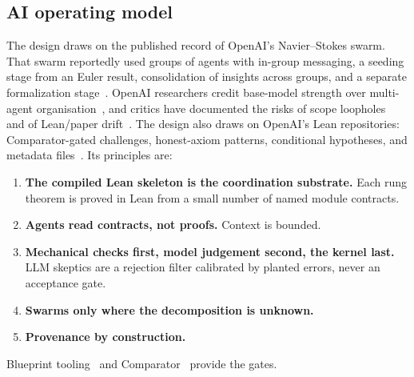 \documentclass[11pt]{article}
\theoremstyle{definition}
\theoremstyle{remark}
\begin{document}
\subsection{AI operating model}
The design draws on the published record of OpenAI's Navier--Stokes swarm. That swarm reportedly
used groups of agents with in-group messaging, a seeding stage from an Euler result, consolidation
of insights across groups, and a separate formalization
stage~\cite{OpenAI2026g,Howlett2026h,OpenAI2026k}. OpenAI researchers credit base-model strength
over multi-agent organisation~\cite{Patel2026}, and critics have documented the risks of scope
loopholes~\cite{Howlett2026b,Constantin2026c} and of Lean/paper drift~\cite{Bastounis2026}. The
design also draws on OpenAI's Lean repositories: Comparator-gated challenges, honest-axiom
patterns, conditional hypotheses, and metadata
files~\cite{OpenAI2026m,OpenAI2026j,OpenAI2026l,LeanFRO2026,Mathlib2026b}.
Its principles are:
\begin{enumerate}[leftmargin=*]
\item \textbf{The compiled Lean skeleton is the coordination substrate.} Each rung theorem is
  proved in Lean from a small number of named module contracts.
\item \textbf{Agents read contracts, not proofs.} Context is bounded.
\item \textbf{Mechanical checks first, model judgement second, the kernel last.} LLM skeptics
  are a rejection filter calibrated by planted errors, never an acceptance gate.
\item \textbf{Swarms only where the decomposition is unknown.}
\item \textbf{Provenance by construction.}
\end{enumerate}
Blueprint tooling~\cite{Massot2026,Becker2024} and Comparator~\cite{LeanFRO2026} provide the
gates.
\end{document}
